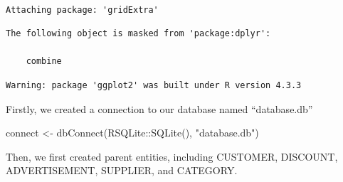 \documentclass[
  letterpaper,
  DIV=11,
  numbers=noendperiod]{scrartcl}
\newenvironment{Shaded}{\begin{snugshade}}{\end{snugshade}}
\newcommand{\FunctionTok}[1]{\textcolor[rgb]{0.28,0.35,0.67}{#1}}
\newcommand{\NormalTok}[1]{\textcolor[rgb]{0.00,0.23,0.31}{#1}}
\newcommand{\OtherTok}[1]{\textcolor[rgb]{0.00,0.23,0.31}{#1}}
\newcommand{\SpecialCharTok}[1]{\textcolor[rgb]{0.37,0.37,0.37}{#1}}
\newcommand{\StringTok}[1]{\textcolor[rgb]{0.13,0.47,0.30}{#1}}
\begin{document}
\begin{verbatim}

Attaching package: 'gridExtra'
\end{verbatim}

\begin{verbatim}
The following object is masked from 'package:dplyr':

    combine
\end{verbatim}

\begin{verbatim}
Warning: package 'ggplot2' was built under R version 4.3.3
\end{verbatim}

Firstly, we created a connection to our database named ``database.db''

\begin{Shaded}
\begin{Highlighting}[]
\NormalTok{connect }\OtherTok{\textless{}{-}} \FunctionTok{dbConnect}\NormalTok{(RSQLite}\SpecialCharTok{::}\FunctionTok{SQLite}\NormalTok{(), }\StringTok{"database.db"}\NormalTok{)}
\end{Highlighting}
\end{Shaded}

Then, we first created parent entities, including CUSTOMER, DISCOUNT,
ADVERTISEMENT, SUPPLIER, and CATEGORY.
\end{document}
